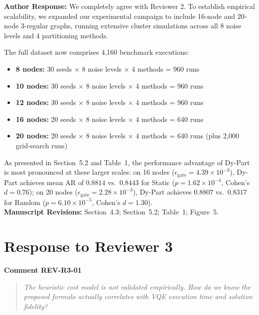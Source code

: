 \documentclass[11pt,a4paper]{article}
\newcommand{\commentbox}[2]{
    \vspace{0.8em}
    \noindent\textbf{\textcolor{commentcolor}{#1}}
    \vspace{0.2em}
    \begin{quote}
        \small\itshape #2
    \end{quote}
}
\newcommand{\responsebox}[1]{
    \noindent\textbf{\textcolor{responsecolor}{Author Response:}} #1
    \vspace{0.8em}
}
\begin{document}
\responsebox{We completely agree with Reviewer 2. To establish empirical scalability, we expanded our experimental campaign to include 16-node and 20-node 3-regular graphs, running extensive cluster simulations across all 8 noise levels and 4 partitioning methods.

The full dataset now comprises 4,160 benchmark executions:
\begin{itemize}[noitemsep]
    \item \textbf{8 nodes:} 30 seeds $\times$ 8 noise levels $\times$ 4 methods = 960 runs
    \item \textbf{10 nodes:} 30 seeds $\times$ 8 noise levels $\times$ 4 methods = 960 runs
    \item \textbf{12 nodes:} 30 seeds $\times$ 8 noise levels $\times$ 4 methods = 960 runs
    \item \textbf{16 nodes:} 20 seeds $\times$ 8 noise levels $\times$ 4 methods = 640 runs
    \item \textbf{20 nodes:} 20 seeds $\times$ 8 noise levels $\times$ 4 methods = 640 runs (plus 2,000 grid-search runs)
\end{itemize}
As presented in Section~5.2 and Table~1, the performance advantage of Dy-Part is most pronounced at these larger scales: on 16 nodes ($\epsilon_{\text{gate}} = 4.39 \times 10^{-3}$), Dy-Part achieves mean AR of $0.8814$ vs.\ $0.8443$ for Static ($p = 1.62 \times 10^{-4}$, Cohen's $d = 0.76$); on 20 nodes ($\epsilon_{\text{gate}} = 2.28 \times 10^{-3}$), Dy-Part achieves $0.8807$ vs.\ $0.8317$ for Random ($p = 6.10 \times 10^{-5}$, Cohen's $d = 1.30$).
\\[0.3em]
\textbf{Manuscript Revisions:} Section~4.3; Section~5.2; Table~1; Figure~5.}

\newpage

\section*{Response to Reviewer 3}

\commentbox{Comment REV-R3-01}{The heuristic cost model is not validated empirically. How do we know the proposed formula actually correlates with VQE execution time and solution fidelity?}
\end{document}
